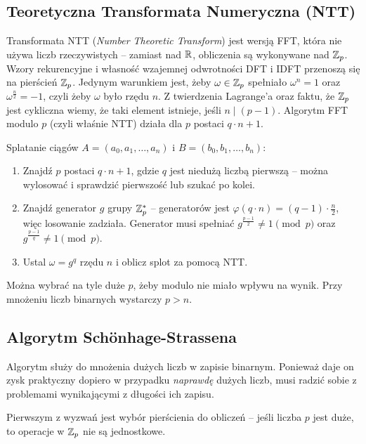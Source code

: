 \subsection{Teoretyczna Transformata Numeryczna (NTT)}
Transformata NTT (\textit{Number Theoretic Transform}) jest wersją FFT, która nie używa liczb rzeczywistych -- zamiast nad \( \mathbb{R} \), obliczenia są wykonywane nad \( \mathbb{Z}_p \).
Wzory rekurencyjne i własność wzajemnej odwrotności DFT i IDFT przenoszą się na pierścień \( \mathbb{Z}_p \). Jedynym warunkiem jest, żeby \( \omega \in \mathbb{Z}_p \) spełniało \( \omega^n = 1 \) oraz  \( \omega^{\frac{n}{2}} = -1 \), czyli żeby \( \omega \) było rzędu \( n \).
Z twierdzenia Lagrange'a oraz faktu, że \( \mathbb{Z}_p \) jest cykliczna wiemy, że taki element istnieje, jeśli \( n \mid (p - 1) \). Algorytm FFT modulo \( p \) (czyli właśnie NTT) działa dla \( p \) postaci \( q \cdot n + 1 \).

\begin{greyframe}
	Splatanie ciągów \( A = (a_0, a_1, \ldots, a_n) \) i \( B = (b_0, b_1, \ldots, b_n) \):
	\begin{enumerate}
		\item Znajdź \( p \) postaci \( q \cdot n + 1 \), gdzie \( q \) jest niedużą liczbą pierwszą -- można wylosować i sprawdzić pierwszość lub szukać po kolei.
		\item Znajdź generator \( g \) grupy \( \mathbb{Z}^{*}_p \) -- generatorów jest \( \varphi(q \cdot n) = (q - 1) \cdot \frac{n}{2} \), więc losowanie zadziała.
		      Generator musi spełniać \( g^{\frac{p-1}{2}} \neq 1 \pmod{p} \) oraz \( g^{\frac{p-1}{q}} \neq 1 \pmod{p} \).
		\item Ustal \( \omega = g^q \) rzędu \( n \) i oblicz splot za pomocą NTT.
	\end{enumerate}
\end{greyframe}
Można wybrać na tyle duże \( p \), żeby modulo nie miało wpływu na wynik. Przy mnożeniu liczb binarnych wystarczy \( p > n \).

\subsection{Algorytm Sch{\"o}nhage-Strassena}
Algorytm służy do mnożenia dużych liczb w zapisie binarnym. Ponieważ daje on zysk praktyczny dopiero w przypadku \emph{naprawdę} dużych liczb, musi radzić sobie z problemami wynikającymi z długości ich zapisu.

Pierwszym z wyzwań jest wybór pierścienia do obliczeń -- jeśli liczba \( p \) jest duże, to operacje w \( \mathbb{Z}_p \) nie są jednostkowe.

